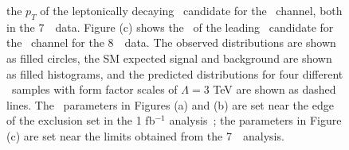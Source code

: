 \begin{figure}[htbp]
\begin{center}
{the $p_T$ of the leptonically decaying \Z\ candidate for the \ZZllvv\ channel, both in the
7~\tev\ data. Figure (c) shows the \pt\ of the leading \Z\ candidate for the \ZZllll\ channel
for the 8~\tev\ data.
The observed distributions are shown as filled circles,
the SM expected signal and background are shown as filled histograms, and the
predicted distributions for four different \TGC\ samples with form factor
 scales of $\Lambda=3$ TeV are shown as dashed lines.
The \TGC\ parameters in Figures (a) and (b) are 
 set near the edge of the exclusion set in the 1 fb$^{-1}$
 analysis~\cite{ATLAS_ZZ4l:1fb2011}; the \TGC parameters in Figure (c) are
 set near the limits obtained from the 7~\tev\ analysis.}
\label{fig:tgc-nicePlot}
\end{center}
\end{figure}


